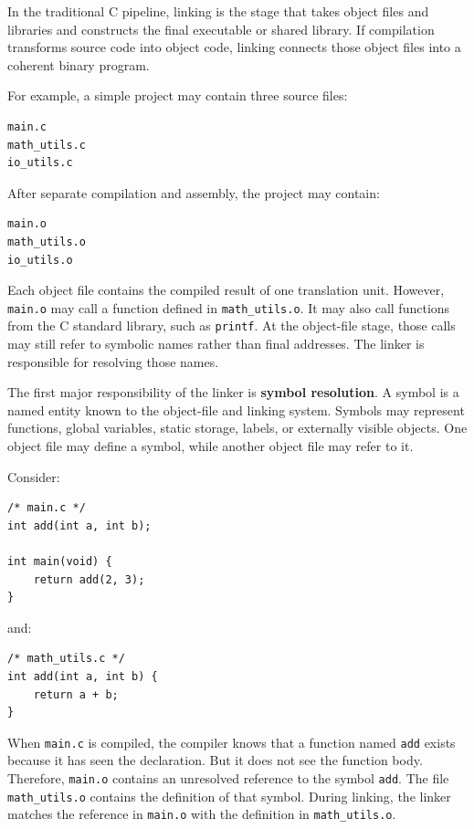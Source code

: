 In the traditional C pipeline, linking is the stage that takes object files and libraries and constructs the final executable or shared library. If compilation transforms source code into object code, linking connects those object files into a coherent binary program.

For example, a simple project may contain three source files:

\begin{verbatim}
main.c
math_utils.c
io_utils.c
\end{verbatim}

After separate compilation and assembly, the project may contain:

\begin{verbatim}
main.o
math_utils.o
io_utils.o
\end{verbatim}

Each object file contains the compiled result of one translation unit. However, \texttt{main.o} may call a function defined in \texttt{math\_utils.o}. It may also call functions from the C standard library, such as \texttt{printf}. At the object-file stage, those calls may still refer to symbolic names rather than final addresses. The linker is responsible for resolving those names.

The first major responsibility of the linker is \textbf{symbol resolution}. A symbol is a named entity known to the object-file and linking system. Symbols may represent functions, global variables, static storage, labels, or externally visible objects. One object file may define a symbol, while another object file may refer to it.

Consider:

\begin{verbatim}
/* main.c */
int add(int a, int b);

int main(void) {
    return add(2, 3);
}
\end{verbatim}

and:

\begin{verbatim}
/* math_utils.c */
int add(int a, int b) {
    return a + b;
}
\end{verbatim}

When \texttt{main.c} is compiled, the compiler knows that a function named \texttt{add} exists because it has seen the declaration. But it does not see the function body. Therefore, \texttt{main.o} contains an unresolved reference to the symbol \texttt{add}. The file \texttt{math\_utils.o} contains the definition of that symbol. During linking, the linker matches the reference in \texttt{main.o} with the definition in \texttt{math\_utils.o}.

